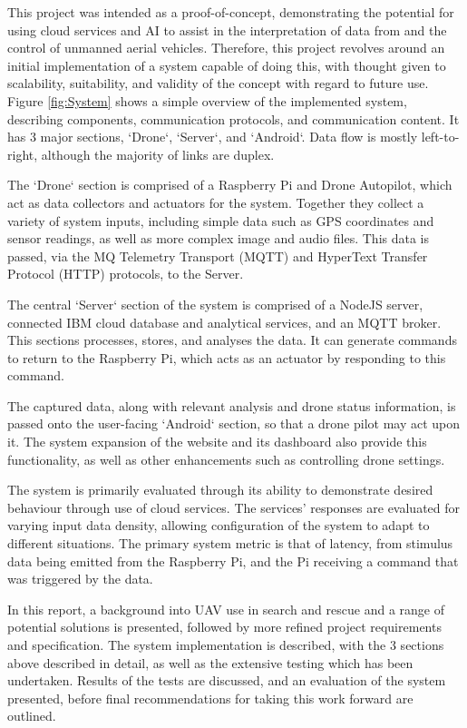 \documentclass{article}
\begin{document}
This project was intended as a proof-of-concept, demonstrating the potential for using cloud services and AI to assist in the interpretation of data from and the control of unmanned aerial vehicles. Therefore, this project revolves around an initial implementation of a system capable of doing this, with thought given to scalability, suitability, and validity of the concept with regard to future use. Figure \ref{fig:System} shows a simple overview of the implemented system, describing components, communication protocols, and communication content. It has 3 major sections, `Drone`, `Server`, and `Android`. Data flow is mostly left-to-right, although the majority of links are duplex. 

The `Drone` section is comprised of a Raspberry Pi and Drone Autopilot, which act as data collectors and actuators for the system. Together they collect a variety of system inputs, including simple data such as GPS coordinates and sensor readings, as well as more complex image and audio files. This data is passed, via the MQ Telemetry Transport (MQTT) and HyperText Transfer Protocol (HTTP) protocols, to the Server. 

The central `Server` section of the system is comprised of a NodeJS server, connected IBM cloud database and analytical services, and an MQTT broker. This sections processes, stores, and analyses the data. It can generate commands to return to the Raspberry Pi, which acts as an actuator by responding to this command. 

The captured data, along with relevant analysis and drone status information, is passed onto the user-facing `Android` section, so that a drone pilot may act upon it. The system expansion of the website and its dashboard also provide this functionality, as well as other enhancements such as controlling drone settings.

The system is primarily evaluated through its ability to demonstrate desired behaviour through use of cloud services. The services' responses are evaluated for varying input data density, allowing configuration of the system to adapt to different situations. The primary system metric is that of latency, from stimulus data being emitted from the Raspberry Pi, and the Pi receiving a command that was triggered by the data. 

In this report, a background into UAV use in search and rescue and a range of potential solutions is presented, followed by more refined project requirements and specification. The system implementation is described, with the 3 sections above described in detail, as well as the extensive testing which has been undertaken. Results of the tests are discussed, and an evaluation of the system presented, before final recommendations for taking this work forward are outlined.
\end{document}
